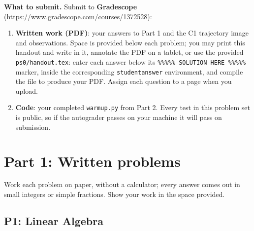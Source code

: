 \documentclass[11pt]{article}
\newcommand{\gradescopelink}{\textbf{Gradescope} (\url{https://www.gradescope.com/courses/1372528})}
\providecommand{\tightlist}{\setlength{\itemsep}{0pt}\setlength{\parskip}{0pt}}
\begin{document}
\vspace{10pt}
\textbf{What to submit.} Submit to \gradescopelink:\vspace{-10pt}
\begin{enumerate}\tightlist
\item \textbf{Written work (PDF)}: your answers to Part 1 and the C1
      trajectory image and observations. Space is
      provided below each problem; you may print this handout and write in
      it, annotate the PDF on a tablet, or use the provided
      \texttt{ps0/handout.tex}: enter each answer below its
      \texttt{\%\%\%\%\% SOLUTION HERE \%\%\%\%\%} marker, inside the
      corresponding \texttt{studentanswer} environment, and compile the file
      to produce your PDF. Assign each question to a page when you upload.
\item \textbf{Code}: your completed \texttt{warmup.py} from Part 2. Every
      test in this problem set is public, so if the autograder passes on
      your machine it will pass on submission.
\end{enumerate}

\newpage
\section*{Part 1: Written problems}

Work each problem on paper, without a calculator; every answer comes out in
small integers or simple fractions. Show your work in the space provided.

\subsection*{P1: Linear Algebra}
\end{document}
